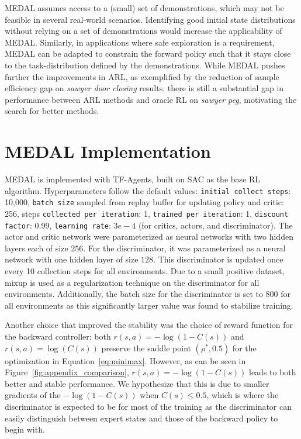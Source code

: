 \documentclass[nohyperref]{article}
\theoremstyle{plain}
\theoremstyle{definition}
\theoremstyle{remark}
\begin{document}
MEDAL assumes access to a (small) set of demonstrations, which may not be feasible in several real-world scenarios. Identifying good initial state distributions without relying on a set of demonstrations would increase the applicability of MEDAL. Similarly, in applications where safe exploration is a requirement, MEDAL can be adapted to constrain the forward policy such that it stays close to the task-distribution defined by the demonstrations. While MEDAL pushes further the improvements in ARL, as exemplified by the reduction of sample efficiency gap on \textit{sawyer door closing} results, there is still a substantial gap in performance between ARL methods and oracle RL on \textit{sawyer peg}, motivating the search for better methods.







\newpage
\appendix
\onecolumn

\section{MEDAL Implementation}
\label{sec:append_medal}
MEDAL is implemented with TF-Agents, built on SAC as the base RL algorithm. Hyperparameters follow the default values: \texttt{initial collect steps}: 10,000, \texttt{batch size} sampled from replay buffer for updating policy and critic: 256, steps \texttt{collected per iteration}: 1, \texttt{trained per iteration}: 1, \texttt{discount factor}: 0.99, \texttt{learning rate}: $3e-4$ (for critics, actors, and discriminator). The actor and critic network were parameterized as neural networks with two hidden layers each of size $256$. For the discriminator, it was parameterized  as a neural network with one hidden layer of size $128$. This discriminator is updated once every 10 collection steps for all environments. Due to a small positive dataset, mixup \citep{zhang2017mixup} is used as a regularization technique on the discriminator for all environments. Additionally, the batch size for the discriminator is set to $800$ for all environments as this significantly larger value was found to stabilize training. 

Another choice that improved the stability was the choice of reward function for the backward controller: both $r(s, a) = -\log(1-C(s))$ and $r(s, a) = \log(C(s))$ preserve the saddle point $(\rho^*, 0.5)$ for the optimization in Equation~\ref{eq:minimax}. However, as can be seen in Figure~\ref{fig:appendix_comparison}, $r(s, a) = -\log(1-C(s))$ leads to both better and stable performance. We hypothesize that this is due to smaller gradients of the $-\log(1-C(s))$ when $C(s)\leq 0.5$, which is where the discriminator is expected to be for most of the training as the discriminator can easily distinguish between expert states and those of the backward policy to begin with.
\end{document}
